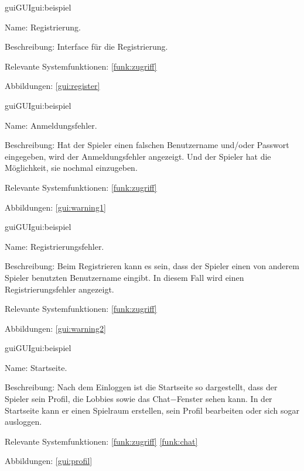 \begin{description}[leftmargin=5em, style=sameline]	
	\begin{lhp}{gui}{GUI}{gui:beispiel}
		\item[Name:] Registrierung.
		\item[Beschreibung:] Interface für die Registrierung.
		\item[Relevante Systemfunktionen:] \ref{funk:zugriff}
		\item[Abbildungen:] \ref{gui:register}
	\end{lhp}
\end{description}
\begin{description}[leftmargin=5em, style=sameline]	
	\begin{lhp}{gui}{GUI}{gui:beispiel}
		\item[Name:] Anmeldungsfehler.
		\item[Beschreibung:] Hat der Spieler einen falschen Benutzername und/oder Passwort eingegeben, wird der Anmeldungsfehler angezeigt. Und der Spieler hat die Möglichkeit, sie nochmal einzugeben.
		\item[Relevante Systemfunktionen:] \ref{funk:zugriff}
		\item[Abbildungen:] \ref{gui:warning1}
	\end{lhp}
\end{description}
\begin{description}[leftmargin=5em, style=sameline]	
	\begin{lhp}{gui}{GUI}{gui:beispiel}
		\item[Name:] Registrierungsfehler.
		\item[Beschreibung:] Beim Registrieren kann es sein, dass der Spieler einen von anderem Spieler benutzten Benutzername eingibt. In diesem Fall wird einen Registrierungsfehler angezeigt.
		\item[Relevante Systemfunktionen:] \ref{funk:zugriff}
		\item[Abbildungen:] \ref{gui:warning2}
	\end{lhp}
\end{description}
\begin{description}[leftmargin=5em, style=sameline]	
	\begin{lhp}{gui}{GUI}{gui:beispiel}
		\item[Name:] Startseite.
		\item[Beschreibung:] Nach dem Einloggen ist die Startseite so dargestellt, dass der Spieler sein Profil, die Lobbies sowie das Chat$-$Fenster sehen kann. In der Startseite kann er einen Spielraum erstellen, sein Profil bearbeiten oder sich sogar ausloggen.
		\item[Relevante Systemfunktionen:] \ref{funk:zugriff} \ref{funk:chat}
		\item[Abbildungen:] \ref{gui:profil}
	\end{lhp}
\end{description}
